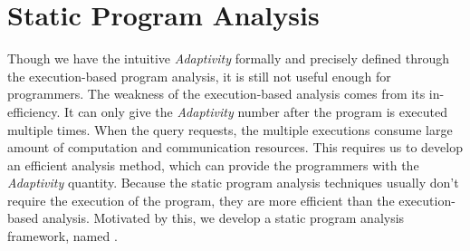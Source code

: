 \section{Static Program Analysis}
\label{sec:intro-static}
%
Though we have the intuitive \emph{Adaptivity} formally and precisely defined through the execution-based program analysis,
it is still not useful enough for programmers.
The weakness of the execution-based analysis comes from its in-efficiency.
It can only give the \emph{Adaptivity} number
after the program is executed multiple times.
When the query requests, the multiple executions consume large amount of computation and communication resources.
This requires us to develop an efficient analysis method, 
which can provide the programmers with the \emph{Adaptivity} quantity.
Because the static program analysis techniques usually don't require the execution of the program,
they are more efficient than the execution-based analysis.
Motivated by this, we develop a static program analysis framework, named {\THESYSTEM}.


